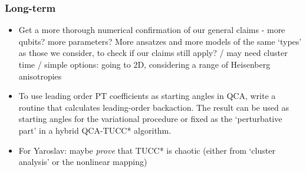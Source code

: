 \documentclass[10pt, a4paper]{article}
\begin{document}
\subsubsection*{Long-term}
\begin{itemize}



\item Get a more thorough numerical confirmation of our general claims - more qubits? more parameters? More ansatzes and more models of the same `types' as those we consider, to check if our claims still apply? / may need cluster time / simple options: going to 2D, considering a range of Heisenberg anisotropies

\item To use leading order PT coefficients as starting angles in QCA, write a routine that calculates leading-order backaction. The result can be used as starting angles for the variational procedure or fixed as the `perturbative part' in a hybrid QCA-TUCC* algorithm.

\item For Yaroslav: maybe \textit{prove} that TUCC* is chaotic (either from `cluster analysis' or the nonlinear mapping)

\end{itemize}
\end{document}
